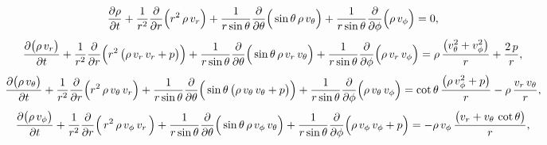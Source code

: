 \documentclass[10pt,preprint]{aastex}
\begin{document}
\begin{equation}
  \frac{\partial \rho}{\partial t}
  +\frac{1}{r^{2}}\frac{\partial }{\partial r}\Big(r^{2}\,\rho\,v_{r}\Big)
  +\frac{1}{r\sin\theta}\frac{\partial }{\partial \theta}\Big(\sin\theta\,\rho\,v_{\theta}\Big)
  +\frac{1}{r\sin\theta}\frac{\partial }{\partial \phi}\Big(\rho\,v_{\phi}\Big)=0,
\end{equation}
\begin{equation}
  \frac{\partial \big(\rho\,v_{r}\big)}{\partial t}
  +\frac{1}{r^{2}}\frac{\partial }{\partial r}\Big(r^{2}\,\big(\rho\,v_{r}\,v_{r}+p\big)\Big)
  +\frac{1}{r\sin\theta}\frac{\partial }{\partial \theta}\Big(\sin\theta\,\rho\,v_{r}\,v_{\theta}\Big)
  +\frac{1}{r\sin\theta}\frac{\partial }{\partial \phi}\Big(\rho\,v_{r}\,v_{\phi}\Big)
  =\rho\,\frac{\big(v_{\theta}^{2}+v_{\phi}^{2}\big)}{r}+\frac{2\,p}{r},
\end{equation}
\begin{equation}
  \frac{\partial \big(\rho\,v_{\theta}\big)}{\partial t}
  +\frac{1}{r^{2}}\frac{\partial }{\partial r}\Big(r^{2}\,\rho\,v_{\theta}\,v_{r}\Big)
  +\frac{1}{r\sin\theta}\frac{\partial }{\partial \theta}\Big(\sin\theta\,\big(\rho\,v_{\theta}\,v_{\theta}+p\big)\Big)
  +\frac{1}{r\sin\theta}\frac{\partial }{\partial \phi}\Big(\rho\,v_{\theta}\,v_{\phi}\Big)
  =\cot\theta\,\frac{\big(\rho\,v_{\phi}^{2}+p\big)}{r}-\rho\,\frac{v_{r}\,v_{\theta}}{r},
\end{equation}
\begin{equation}
  \frac{\partial \big(\rho\,v_{\phi}\big)}{\partial t}
  +\frac{1}{r^{2}}\frac{\partial }{\partial r}\Big(\,r^{2}\,\rho\,v_{\phi}\,v_{r}\,\Big)
  +\frac{1}{r\sin\theta}\frac{\partial }{\partial \theta}\Big(\sin\theta\,\rho\,v_{\phi}\,v_{\theta}\Big)
  +\frac{1}{r\sin\theta}\frac{\partial }{\partial \phi}\Big(\rho\,v_{\phi}\,v_{\phi}+p\Big)
  =-\rho\,v_{\phi}\,\frac{\big(v_{r}+v_{\theta}\,\cot\theta\big)}{r},
\end{equation}
\end{document}
